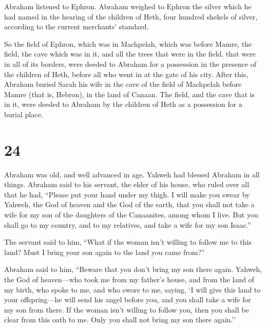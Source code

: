  Abraham listened to Ephron. Abraham weighed to Ephron the
silver which he had named in the hearing of the children of Heth, four
hundred shekels of silver, according to the current merchants' standard.

 So the field of Ephron, which was in Machpelah, which was
before Mamre, the field, the cave which was in it, and all the trees
that were in the field, that were in all of its borders, were deeded
 to Abraham for a possession in the presence of the
children of Heth, before all who went in at the gate of his city.
 After this, Abraham buried Sarah his wife in the cave of
the field of Machpelah before Mamre (that is, Hebron), in the land of
Canaan.  The field, and the cave that is in it, were deeded
to Abraham by the children of Heth as a possession for a burial place.

\hypertarget{section-23}{%
\section{24}\label{section-23}}

 Abraham was old, and well advanced in age. Yahweh had
blessed Abraham in all things.  Abraham said to his servant,
the elder of his house, who ruled over all that he had, ``Please put
your hand under my thigh.  I will make you swear by Yahweh,
the God of heaven and the God of the earth, that you shall not take a
wife for my son of the daughters of the Canaanites, among whom I live.
 But you shall go to my country, and to my relatives, and
take a wife for my son Isaac.''

 The servant said to him, ``What if the woman isn't willing
to follow me to this land? Must I bring your son again to the land you
came from?''

 Abraham said to him, ``Beware that you don't bring my son
there again.  Yahweh, the God of heaven---who took me from
my father's house, and from the land of my birth, who spoke to me, and
who swore to me, saying, `I will give this land to your offspring---he
will send his angel before you, and you shall take a wife for my son
from there.  If the woman isn't willing to follow you, then
you shall be clear from this oath to me. Only you shall not bring my son
there again.''

